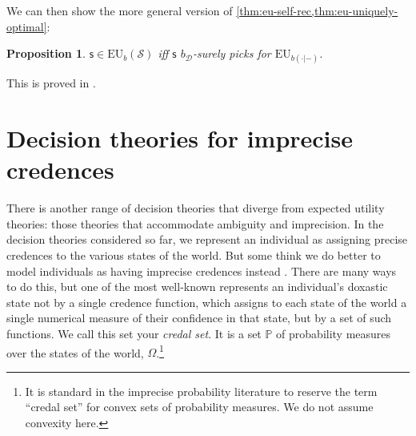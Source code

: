 \documentclass[a4paper]{article}
\newtheorem{proposition}[theorem]{Proposition}
\renewcommand\P{\mathbb{P}} %
\newcommand\EU{\mathrm{EU}}
\newcommand{\Decs}{\mathcal{D}}
\renewcommand\S{\mathcal{S}}
\newcommand\s{\mathsf{s}}
\newcommand{\IP}{\P}
\newcommand{\todoold}[2][]{\todo[backgroundcolor=white,bordercolor=orange!10,linecolor=gray!10, #1,caption={},textcolor=gray]{Pre-rev: #2}}
\newcommand{\todooldinfo}[2][]{\todoold[#1]{#2}}
\newcommand{\Strategies}{\S}
\newenvironment{CCM rewritten}
{\begingroup\color{blue}} %
{\endgroup}              %
\begin{document}
We can then show the more general version of \cref{thm:eu-self-rec,thm:eu-uniquely-optimal}:
\begin{proposition}\label{thm:eu-dep}
	$\s\in\EU_b(\Strategies)$ iff $\s$ $b_\Decs$-surely picks for $\EU_{b(\cdot|-)}$.
\end{proposition}
This is proved in .








\section{Decision theories for imprecise credences}

There is another range of decision theories that diverge from expected utility theories: those theories that accommodate ambiguity and imprecision. In the decision theories considered so far, we represent an individual as assigning precise credences to the various states of the world. But some think we do better to model individuals as having imprecise credences instead \citep{walley1991srip, bradley2016ip}. There are many ways to do this, but one of the most well-known represents an individual's doxastic state not by a single credence function, which assigns to each state of the world a single numerical measure of their confidence in that state, but by a set of such functions. We call this set your \emph{credal set}. It is a set $\IP$ of probability measures over the states of the world, $\Omega$.\footnote{{It is standard in the imprecise probability literature to reserve the term ``credal set'' for convex sets of probability measures. We do not assume convexity here.}}
\end{document}
